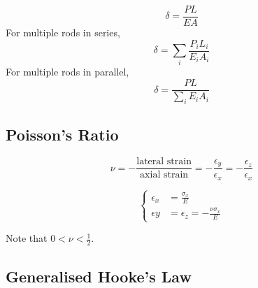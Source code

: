 \documentclass[twoside]{article}
\begin{document}
	\begin{equation}
		\delta = \frac{PL}{EA}
		\label{eq:Deformation}
	\end{equation}
	For multiple rods in series,
	\begin{equation}
		\delta = \sum_i \frac{P_i L_i}{E_i A_i}
		\label{eq:DeformationSeries}
	\end{equation}
	For multiple rods in parallel,
	\begin{equation}
		\delta = \frac{PL}{\sum_i E_i A_i}
		\label{eq:DeformationParallel}
	\end{equation}
	
	\subsection{Poisson's Ratio}
	
	\begin{equation}
		\nu = -\frac{\text{lateral strain}}{\text{axial strain}} = -\frac{\epsilon_y}{\epsilon_x} = -\frac{\epsilon_z}{\epsilon_x}
		\label{eq:PoissonsRatio}
	\end{equation}
	
	\begin{equation}
		\begin{cases}
			\epsilon_x &= \frac{\sigma_x}{E} \\
			\epsilon y &= \epsilon_z = -\frac{\nu \sigma_x}{E}
		\end{cases}
		\label{eq:LateralAndAxialStrain}
	\end{equation}
	
	Note that $0 < \nu < \frac{1}{2}$.
	
	\subsection{Generalised Hooke's Law}
	
\end{document}
